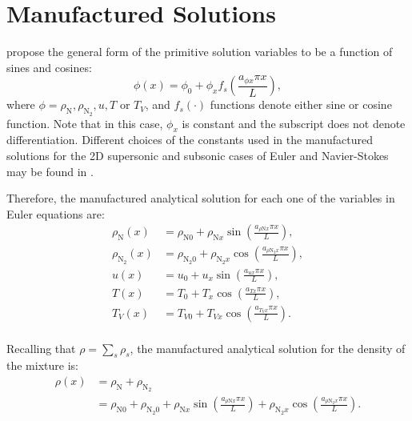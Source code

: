 \documentclass[10pt]{article}
\begin{document}
\section{Manufactured Solutions}

\citet{Roy2002} propose the general form of the primitive solution variables to be a function of sines and cosines:
\begin{equation}
 \label{eq:manufactured01}
 \phi (x) = \phi_0+ \phi_x f_s\left(\frac{a_{\phi x} \pi x}{L}\right) ,
\end{equation}
where $\phi=\rho_{\text{N}},\rho_{\text{N}_2}, u, T$ or $T_V$, and $f_s(\cdot)$ functions denote either sine or cosine function. Note that in this case, $\phi_x$ is constant and the subscript does not denote differentiation. Different choices of the constants used in the manufactured solutions for the 2D supersonic and subsonic cases of Euler and Navier-Stokes may be found in \citet{Roy2002}.

Therefore, the manufactured analytical solution for each one of the variables in Euler equations are:
\begin{equation}
\begin{split}
\label{eq:manufactured02}
\rho_{\text{N}}(x) &= \rho_{\text{N}0} + \rho_{\text{N}x} \sin\left(\frac{a_{  \rho \text{N} x }\pi x}{L}\right),\\
\rho_{\text{N}_2}(x) &= \rho_{\text{N}_2 0}+ \rho_{\text{N}_2 x} \cos\left(\frac{a_{ \rho \text{N}_2 x } \pi x}{L}\right),\\
u(x) &= u_{0}+u_{x} \sin\left(\frac{a_{u x} \pi x}{L}\right),\\
T(x) &= T_{0}+T_{x} \cos\left(\frac{a_{T x} \pi x}{L}\right),\\
T_V(x) &= T_{V0}+T_{Vx} \cos\left(\frac{a_{T_V x} \pi x}{L}\right).\\
\end{split}
\end{equation}

Recalling that $\rho=\sum_s \rho_s$, the manufactured analytical solution for the density of the mixture  is:
\begin{equation}
\label{eq:manufactured03}
\begin{split}
\rho(x) &= \rho_{\text{N}}+\rho_{\text{N}_2}\\
                     &= \rho_{\text{N}0} + \rho_{\text{N}_2 0} +
\rho_{\text{N}x} \sin\left(\frac{a_{  \rho \text{N} x }\pi x}{L}\right) + \rho_{\text{N}_2 x} \cos\left(\frac{a_{ \rho \text{N}_2 x } \pi x}{L}\right) .
\end{split}
\end{equation}
\end{document}

